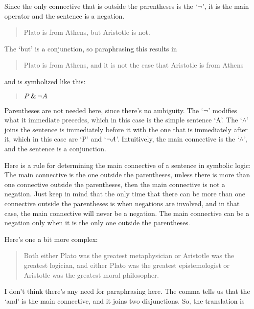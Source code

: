\documentclass[../logic-text.tex]{subfiles}
\begin{document}
\noindent Since the only connective that is outside the parentheses is the \enquote*{\(\neg\)}, it is the main operator and the sentence is a negation.



\begin{quote}
  Plato is from Athens, but Aristotle is not.
\end{quote}

The \enquote*{but} is a conjunction, so paraphrasing this results in

\begin{quote}
  Plato is from Athens, and it is not the case that Aristotle is from Athens
\end{quote}

and is symbolized like this:

\begin{quote}
  \(P \mathbin{\&} \neg A\)
\end{quote}

Parentheses are not needed here, since there's no ambiguity. The \enquote*{\(\neg\)} modifies what it immediate precedes, which in this case is the simple sentence \enquote*{A}. The \enquote*{\(\land\)} joins the sentence is immediately before it with the one that is immediately after it, which in this case are \enquote*{P} and \enquote*{\(\neg A\)}. Intuitively, the main connective is the \enquote*{\(\land\)}, and the sentence is a conjunction.

Here is a rule for determining the main connective of a sentence in symbolic logic:
The main connective is the one outside the parentheses, unless there is more than one connective outside the parentheses, then the main connective is not a negation. Just keep in mind that the only time that there can be more than one connective outside the parentheses is when negations are involved, and in that case, the main connective will never be a negation. The main connective can be a negation only when it is the only one outside the parentheses.


Here's one a bit more complex:

\begin{quote}
  Both either Plato was the greatest metaphysician or Aristotle was the greatest logician, and either Plato was the greatest epistemologist or Aristotle was the greatest moral philosopher.
\end{quote}

\noindent I don't think there's any need for paraphrasing here. The comma tells us that the \enquote*{and} is the main connective, and it joins two disjunctions. So, the translation is
\end{document}
